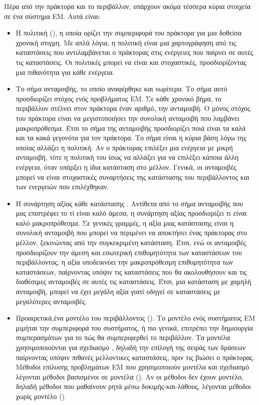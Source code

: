 Πέρα από την πράκτορα και το περιβάλλον, υπάρχουν ακόμα τέσσερα κύρια στοιχεία σε ένα σύστημα ΕΜ. Αυτά είναι:
\begin{itemize}
    \item Η πολιτική (), η οποία ορίζει την συμπεριφορά του πράκτορα για μια δοθείσα
          χρονική στιγμη. Με απλά λόγια, η πολιτική είναι μια χαρτογράφηση από τις καταστάσεις
          που αντιλαμβάνεται ο πράκτορας στις ενέργειες που παίρνει σε αυτές τις καταστάσεις. Οι
          πολιτικές μπορεί να είναι και στοχαστικές, προσδιορίζοντας μια πιθανότητα για κάθε ενέργεια.
    \item Το σήμα ανταμοιβής, το οποίο αναφέρθηκε και νωρίτερα. Το σήμα αυτό προσδιορίζει στόχος ενός προβλήματος
          ΕΜ. Σε κάθε χρονικό βήμα, το περιβάλλον στέλνει στον πράκτορα έναν αριθμό, την ανταμοιβή.
          Ο μόνος στόχος του πράκτορα είναι να μεγιστοποιήσει την συνολική ανταμοιβή που λαμβάνει
          μακροπρόθεσμα. Έτσι το σήμα της ανταμοιβής προσδιορίζει	ποιά είναι τα καλά και τα κακά
          γεγονότα για τον πράκτορα. Το σήμα είναι η κύρια βάση λόγω της οποίας αλλάζει η πολιτική.
          Αν ο πράκτορας επιλέξει μια ενέργεια με μικρή ανταμοιβή, τότε η πολιτική του ίσως να αλλάξει
          για να επιλέξει κάποια άλλη ενέργεια, όταν υπάρξει η ίδια κατάσταση στο μέλλον. Γενικά, οι
          ανταμοιβές μπορεί να είναι στοχαστικές συναρτήσεις της κατάστασης του περιβάλλοντος και των
          ενεργειών που επιλέχθηκαν.
    \item Η συνάρτηση αξίας κάθε κατάστασης . Αντίθετα από το σήμα ανταμοιβής που μας
          επιστρέφει το τί είναι καλό άμεσα, η συνάρτηση αξίας προσδιορίζει τι είναι καλό μακροπρόθεσμα.
          Σε γενικές γραμμές, η αξία μιας κατάστασης είναι η συνολική ανταμοιβή που μπορεί να περιμένει
          να αποκτήσει ένας πράκτορας στο μέλλον, ξεκινώντας από την συγκεκριμένη κατάσταση. Έτσι, ενώ
          οι ανταμοιβές προσδιορίζουν την άμεση και εσωτερική επιθυμητότητα των καταστάσεων του περιβάλλοντος,
          η αξία υποδεικνύει την μακροπρόθεσμη επιθυμητότητα των καταστάσεων, παίρνοντας υπόψιν τις καταστάσεις
          που θα ακολουθήσουν και τις διαθέσιμες ανταμοιβές σε αυτές τις καταστάσεις. Έτσι, μια κατάσταση
          με χαμηλή ανταμοιβή, μπορεί να έχει μεγάλη αξία γιατί οδηγεί σε καταστάσεις με μεγαλύτερες ανταμοιβές.
    \item Προαιρετικά,ένα μοντέλο του περιβάλλοντος (). Το μοντέλο ενός συστήματος ΕΜ μιμήται την
          συμπεριφορά του συστήματος, ή πιο γενικά, επιτρέπει την δημιουργία συμπερασμάτων για το πώς θα
          συμπεριφερθεί το περιβάλλον. Τα μοντέλα χρησιμοποιούνται για σχεδιασμό , δηλαδή την επίλογή της
          σειράς των δράσεων παίρνοντας υπόψιν πιθανές μελλοντικες καταστάσεις, πριν τις βιώσει ο πράκτορας.
          Μέθοδοι επίλυσης προβλημάτων ΕΜ που χρησιμοποιούν μοντέλα και σχεδιασμό λέγονται μέθοδοι βασισμένοι
          σε μοντέλα (). Αν οι μέθοδοι δεν έχουν μοντέλο, δηλαδή μέθοδοι που μαθαίνουν ρητά μέσω
          δοκιμής-και-λάθους, λέγονται μέθοδοι χωρίς μοντέλο ().
\end{itemize}

